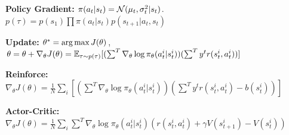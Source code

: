 \textbf{Policy Gradient:} $\pi(a_t|s_t) = \mathcal{N}(\mu_t, \sigma_t^2 | s_t)$. $p(\tau) = p(s_1)\prod \pi(a_t|s_t) p(s_{t+1} | a_t, s_t)$\\

\textbf{Update:} $\theta^* = \operatorname*{arg\,max} J(\theta)$, $\theta = \theta + \nabla_\theta J(\theta) = \mathbb{E}_{\tau \sim p(\tau)}[(\sum^T \nabla_\theta \log \pi_\theta(a_t^i | s_t^i))(\sum^T y^t r(s_t^i, a_t^i))]$\\

\textbf{Reinforce:} $\nabla_\theta J(\theta) = \frac{1}{N} \sum_i[(\sum^T \nabla_\theta \log \pi_\theta(a_t^i | s_t^i))(\sum^T y^t r(s_t^i, a_t^i) - b(s_t^i))]$\\

\textbf{Actor-Critic:} $\nabla_\theta J(\theta) = \frac{1}{N} \sum_i \sum^T \nabla_\theta \log \pi_\theta(a_t^i | s_t^i)(r(s_t^i, a_t^i) + \gamma V(s_{t+1}^i) - V(s_t^i))$\\


